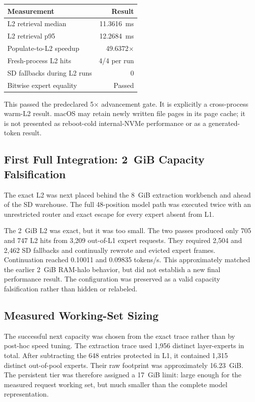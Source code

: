 \begin{center}
\begin{tabular}{@{}lr@{}}
\toprule
Measurement & Result \\
\midrule
L2 retrieval median & 11.3616~ms \\
L2 retrieval p95 & 12.2684~ms \\
Populate-to-L2 speedup & 49.6372$\times$ \\
Fresh-process L2 hits & 4/4 per run \\
SD fallbacks during L2 runs & 0 \\
Bitwise expert equality & Passed \\
\bottomrule
\end{tabular}
\end{center}

This passed the predeclared 5$\times$ advancement gate.  It is explicitly a
cross-process warm-L2 result.  macOS may retain newly written file pages in its
page cache; it is not presented as reboot-cold internal-NVMe performance or as
a generated-token result.

\subsection{First Full Integration: 2~GiB Capacity Falsification}

The exact L2 was next placed behind the 8~GiB extraction workbench and ahead of
the SD warehouse.  The full 48-position model path was executed twice with an
unrestricted router and exact escape for every expert absent from L1.

The 2~GiB L2 was exact, but it was too small.  The two passes produced only
705 and 747 L2 hits from 3,209 out-of-L1 expert requests.  They required 2,504
and 2,462 SD fallbacks and continually rewrote and evicted expert frames.
Continuation reached 0.10011 and 0.09835 tokens/s.  This approximately matched
the earlier 2~GiB RAM-halo behavior, but did not establish a new final
performance result.  The configuration was preserved as a valid capacity
falsification rather than hidden or relabeled.

\subsection{Measured Working-Set Sizing}

The successful next capacity was chosen from the exact trace rather than by
post-hoc speed tuning.  The extraction trace used 1,956 distinct layer-experts
in total.  After subtracting the 648 entries protected in L1, it contained
1,315 distinct out-of-pool experts.  Their raw footprint was approximately
16.23~GiB.  The persistent tier was therefore assigned a 17~GiB limit: large
enough for the measured request working set, but much smaller than the complete
model representation.

